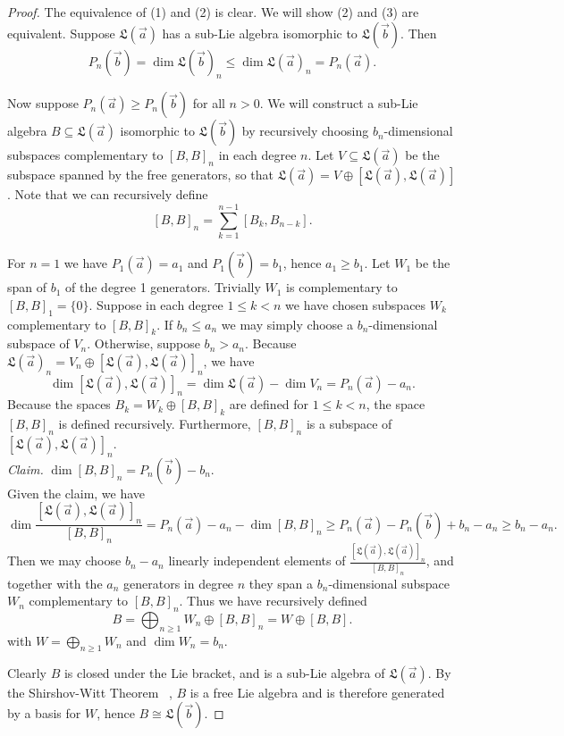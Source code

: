\documentclass[11pt]{amsart}
\theoremstyle{definition}
\numberwithin{equation}{section}
\begin{document}
\begin{proof}
    The equivalence of (1) and (2) is clear. We will show (2) and (3) are equivalent. Suppose $\mathfrak{L}(\vec{a})$ has a sub-Lie algebra isomorphic to $\mathfrak{L}(\vec{b})$. Then
    \[
    P_n(\vec{b}) = \dim \mathfrak{L}(\vec{b})_n \leq \dim \mathfrak{L}(\vec{a})_n = P_n(\vec{a}).
    \]

    Now suppose $P_n(\vec{a}) \geq P_n(\vec{b})$ for all $n > 0$. We will construct a sub-Lie algebra $B \subseteq \mathfrak{L}(\vec{a})$ isomorphic to $\mathfrak{L}(\vec{b})$ by recursively choosing $b_n$-dimensional subspaces complementary to $[B,B]_n$ in each degree $n$. Let $V \subseteq \mathfrak{L}(\vec{a})$ be the subspace spanned by the free generators, so that $\mathfrak{L}(\vec{a}) = V \oplus [\mathfrak{L}(\vec{a}),\mathfrak{L}(\vec{a})]$. Note that we can recursively define 
    \[ 
    [B,B]_n = \sum_{k=1}^{n-1} [B_k,B_{n-k}].
    \]

    For $n=1$ we have $P_1(\vec{a}) = a_1$ and $P_1(\vec{b}) = b_1$, hence $a_1 \geq b_1$. Let $W_1$ be the span of $b_1$ of the degree 1 generators. Trivially $W_1$ is complementary to $[B,B]_1 = \{0\}.$
    Suppose in each degree $1 \leq k < n$ we have chosen subspaces $W_k$ complementary to $[B,B]_k$. If $b_n \leq a_n$ we may simply choose a $b_n$-dimensional subspace of $V_n$. Otherwise, suppose $b_n > a_n$. Because $\mathfrak{L}(\vec{a})_n = V_n \oplus [\mathfrak{L}(\vec{a}),\mathfrak{L}(\vec{a})]_n$, we have
    \[
    \dim [\mathfrak{L}(\vec{a}),\mathfrak{L}(\vec{a})]_n = \dim \mathfrak{L}(\vec{a}) - \dim V_n = P_n(\vec{a}) - a_n.
    \]
    Because the spaces $B_k = W_k \oplus [B,B]_k$ are defined for $1 \leq k < n$, the space $[B,B]_n$ is defined recursively. Furthermore, $[B,B]_n$ is a subspace of $[\mathfrak{L}(\vec{a}),\mathfrak{L}(\vec{a})]_n$.
    \\
    \textit{Claim.} $\dim [B,B]_n = P_n(\vec{b}) - b_n$.
    \\                    
    
    Given the claim, we have
    \[
    \dim \frac{[\mathfrak{L}(\vec{a}),\mathfrak{L}(\vec{a})]_n}{[B,B]_n} = P_n(\vec{a}) - a_n - \dim [B,B]_n \geq P_n(\vec{a}) - P_n(\vec{b}) + b_n - a_n \geq b_n - a_n. 
    \]
    Then we may choose $b_n - a_n$ linearly independent elements of $\frac{[\mathfrak{L}(\vec{a}),\mathfrak{L}(\vec{a})]_n}{[B,B]_n}$, and together with the $a_n$ generators in degree $n$ they span a $b_n$-dimensional subspace $W_n$ complementary to $[B,B]_n.$ Thus we have recursively defined 
    \[
    B = \bigoplus_{n\geq 1}W_n \oplus [B,B]_n = W \oplus [B,B].
    \]
    with $W = \bigoplus_{n\geq 1} W_n$ and $\dim W_n = b_n$.
    
    Clearly $B$ is closed under the Lie bracket, and is a sub-Lie algebra of $\mathfrak{L}(\vec{a}).$ By the Shirshov-Witt Theorem ~\cite[text]{S09}, $B$ is a free Lie algebra and is therefore generated by a basis for $W$, hence $B \cong \mathfrak{L}(\vec{b}).$
\end{proof}
\end{document}
